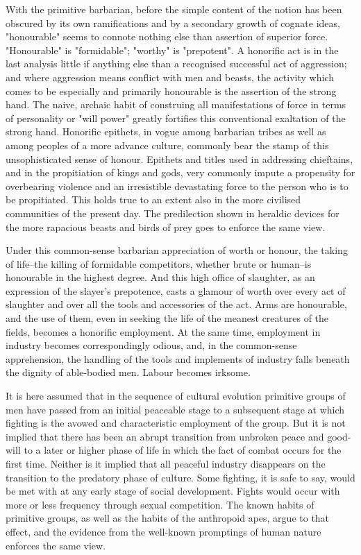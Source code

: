 \documentclass[12pt]{report}
\begin{document}
With the primitive barbarian, before the simple content of the notion
has been obscured by its own ramifications and by a secondary growth of
cognate ideas, "honourable" seems to connote nothing else than
assertion of superior force. "Honourable" is "formidable"; "worthy" is
"prepotent". A honorific act is in the last analysis little if
anything else than a recognised successful act of aggression; and where
aggression means conflict with men and beasts, the activity which comes
to be especially and primarily honourable is the assertion of the strong
hand. The naive, archaic habit of construing all manifestations of
force in terms of personality or "will power" greatly fortifies this
conventional exaltation of the strong hand. Honorific epithets, in
vogue among barbarian tribes as well as among peoples of a more advance
culture, commonly bear the stamp of this unsophisticated sense of
honour. Epithets and titles used in addressing chieftains, and in the
propitiation of kings and gods, very commonly impute a propensity for
overbearing violence and an irresistible devastating force to the person
who is to be propitiated. This holds true to an extent also in the more
civilised communities of the present day. The predilection shown in
heraldic devices for the more rapacious beasts and birds of prey goes to
enforce the same view.

Under this common-sense barbarian appreciation of worth or honour, the
taking of life--the killing of formidable competitors, whether brute
or human--is honourable in the highest degree. And this high office of
slaughter, as an expression of the slayer's prepotence, casts a
glamour of worth over every act of slaughter and over all the tools and
accessories of the act. Arms are honourable, and the use of them, even
in seeking the life of the meanest creatures of the fields, becomes a
honorific employment. At the same time, employment in industry becomes
correspondingly odious, and, in the common-sense apprehension, the
handling of the tools and implements of industry falls beneath the
dignity of able-bodied men. Labour becomes irksome.

It is here assumed that in the sequence of cultural evolution primitive
groups of men have passed from an initial peaceable stage to a
subsequent stage at which fighting is the avowed and characteristic
employment of the group. But it is not implied that there has been an
abrupt transition from unbroken peace and good-will to a later or higher
phase of life in which the fact of combat occurs for the first time.
Neither is it implied that all peaceful industry disappears on the
transition to the predatory phase of culture. Some fighting, it is safe
to say, would be met with at any early stage of social development.
Fights would occur with more or less frequency through sexual
competition. The known habits of primitive groups, as well as the habits
of the anthropoid apes, argue to that effect, and the evidence from the
well-known promptings of human nature enforces the same view.
\end{document}
